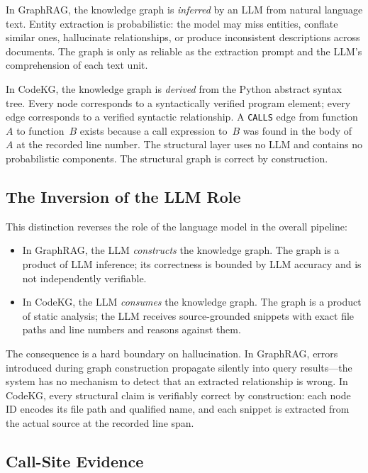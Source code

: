 \documentclass[10pt]{article}
\begin{document}
In GraphRAG, the knowledge graph is \emph{inferred} by an LLM from natural language
text. Entity extraction is probabilistic: the model may miss entities, conflate
similar ones, hallucinate relationships, or produce inconsistent descriptions across
documents. The graph is only as reliable as the extraction prompt and the LLM's
comprehension of each text unit.

In CodeKG, the knowledge graph is \emph{derived} from the Python abstract syntax
tree. Every node corresponds to a syntactically verified program element; every edge
corresponds to a verified syntactic relationship. A \texttt{CALLS} edge from
function~$A$ to function~$B$ exists because a call expression to~$B$ was found in
the body of~$A$ at the recorded line number. The structural layer uses no LLM and
contains no probabilistic components. The structural graph is correct by
construction.

\subsection{The Inversion of the LLM Role}

This distinction reverses the role of the language model in the overall pipeline:

\begin{itemize}
\item In GraphRAG, the LLM \emph{constructs} the knowledge graph. The graph is a
product of LLM inference; its correctness is bounded by LLM accuracy and is not
independently verifiable.
\item In CodeKG, the LLM \emph{consumes} the knowledge graph. The graph is a
product of static analysis; the LLM receives source-grounded snippets with exact
file paths and line numbers and reasons against them.
\end{itemize}

The consequence is a hard boundary on hallucination. In GraphRAG, errors introduced
during graph construction propagate silently into query results---the system has no
mechanism to detect that an extracted relationship is wrong. In CodeKG, every
structural claim is verifiably correct by construction: each node ID encodes its
file path and qualified name, and each snippet is extracted from the actual source
at the recorded line span.

\subsection{Call-Site Evidence}
\end{document}
